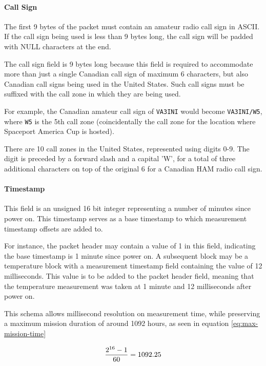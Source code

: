 \paragraph{Call Sign}

The first 9 bytes of the packet must contain an amateur radio call sign in ASCII. If the call sign being used is less
than 9 bytes long, the call sign will be padded with NULL characters at the end.

The call sign field is 9 bytes long because this field is required to accommodate more than just a single Canadian call
sign of maximum 6 characters, but also Canadian call signs being used in the United States. Such call signs must be
suffixed with the call zone in which they are being used. \cite{foreign-broadcast}

For example, the Canadian amateur call sign of \texttt{VA3INI} would become \texttt{VA3INI/W5}, where \texttt{W5} is
the 5th call zone (coincidentally the call zone for the location where Spaceport America Cup is hosted).

There are 10 call zones in the United States, represented using digits 0-9. \cite{us-callzones} The digit is preceded
by a forward slash and a capital 'W', for a total of three additional characters on top of the original 6 for a
Canadian HAM radio call sign.

\paragraph{Timestamp}

This field is an unsigned 16 bit integer representing a number of minutes since power on. This timestamp serves as a
base timestamp to which measurement timestamp offsets are added to.

For instance, the packet header may contain a value of 1 in this field, indicating the base timestamp is 1 minute since
power on. A subsequent block may be a temperature block with a measurement timestamp field containing the value of 12
milliseconds. This value is to be added to the packet header field, meaning that the temperature measurement was taken
at 1 minute and 12 milliseconds after power on.

This schema allows millisecond resolution on measurement time, while preserving a maximum mission duration of around
1092 hours, as seen in equation \ref{eq:max-mission-time}

\begin{equation} \label{eq:max-mission-time}
    \frac{2^{16} - 1}{60} = 1092.25 \\
\end{equation}

